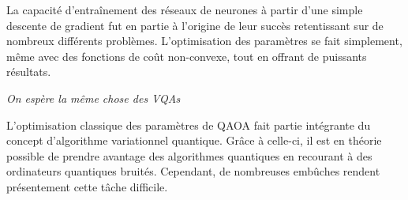 La capacité d'entraînement des réseaux de neurones à partir d'une simple descente de gradient fut en partie à l'origine de leur succès retentissant sur de nombreux différents problèmes. L'optimisation des paramètres se fait simplement, même avec des fonctions de coût non-convexe, tout en offrant de puissants résultats.

\textcolor{mydarkred}{\textit{On espère la même chose des VQAs}}

L'optimisation classique des paramètres de QAOA fait partie intégrante du concept d'algorithme variationnel quantique. Grâce à celle-ci, il est en théorie possible de prendre avantage des algorithmes quantiques en recourant à des ordinateurs quantiques bruités. Cependant, de nombreuses embûches rendent présentement cette tâche difficile. 

